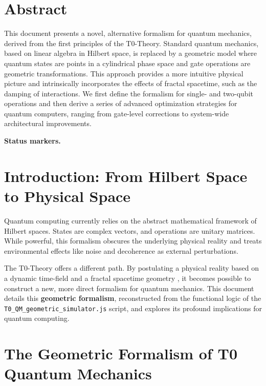 \section*{Abstract}

		This document presents a novel, alternative formalism for quantum mechanics, derived from the first principles of the T0-Theory. Standard quantum mechanics, based on linear algebra in Hilbert space, is replaced by a geometric model where quantum states are points in a cylindrical phase space and gate operations are geometric transformations. This approach provides a more intuitive physical picture and intrinsically incorporates the effects of fractal spacetime, such as the damping of interactions. We first define the formalism for single- and two-qubit operations and then derive a series of advanced optimization strategies for quantum computers, ranging from gate-level corrections to system-wide architectural improvements.

	
	
	
\medskip\noindent\textbf{Status markers.}


	\section{Introduction: From Hilbert Space to Physical Space}
	
	Quantum computing currently relies on the abstract mathematical framework of Hilbert spaces. States are complex vectors, and operations are unitary matrices. While powerful, this formalism obscures the underlying physical reality and treats environmental effects like noise and decoherence as external perturbations.
	
	The T0-Theory offers a different path. By postulating a physical reality based on a dynamic time-field and a fractal spacetime geometry \cite{pascher:fundamentals}, it becomes possible to construct a new, more direct formalism for quantum mechanics. This document details this \textbf{geometric formalism}, reconstructed from the functional logic of the \texttt{T0\_QM\_geometric\_simulator.js} script, and explores its profound implications for quantum computing.
	
	\section{The Geometric Formalism of T0 Quantum Mechanics}
	
